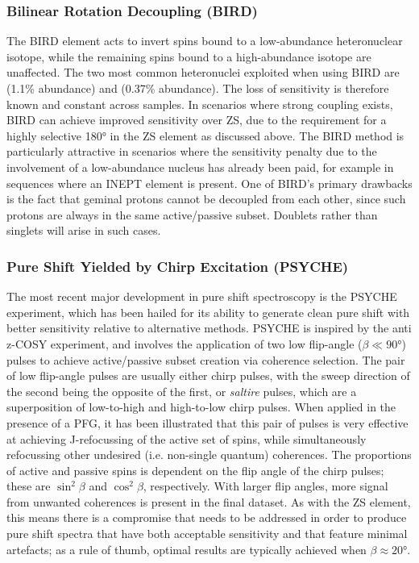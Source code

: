 \subsubsection{Bilinear Rotation Decoupling (BIRD)}
The \ac{BIRD} element acts to invert spins bound to a low-abundance
heteronuclear isotope, while the remaining spins bound to a high-abundance
isotope are unaffected\cite{Garbow1982,Bax1983}.
The two most common heteronuclei exploited when using \ac{BIRD} are 
(1.1\% abundance) and  (0.37\% abundance). The loss of sensitivity
is therefore known and constant across samples. In scenarios where strong
coupling exists, \ac{BIRD} can achieve improved sensitivity over \ac{ZS}, due
to the requirement for a highly selective \ang{180} in the \ac{ZS} element as
discussed above.
The \ac{BIRD} method is particularly attractive in scenarios where the
sensitivity penalty due to the involvement of a low-abundance nucleus has
already been paid, for example in sequences where an \ac{INEPT} element is
present\cite{Paudel2013}. One of \ac{BIRD}'s primary drawbacks is the fact that
geminal protons cannot be decoupled from each other, since such protons are
always in the same active/passive subset. Doublets rather than singlets will
arise in such cases.

\subsubsection{Pure Shift Yielded by Chirp Excitation (PSYCHE)}
\label{subsec:psyche}
The most recent major development in pure shift spectroscopy is the \ac{PSYCHE}
experiment\cite{Foroozandeh2014,Foroozandeh2018}, which has been hailed for its
ability to generate clean pure shift with better sensitivity relative to
alternative methods. \ac{PSYCHE} is inspired by
the anti z-\ac{COSY} experiment\cite{Thrippleton2003}, and involves the application
of two low flip-angle ($\beta \ll \ang{90}$) pulses to achieve active/passive
subset creation via coherence selection. The pair of low flip-angle pulses
are usually either chirp pulses, with the sweep direction of the second being
the opposite of the first, or \emph{saltire} pulses, which are a superposition
of low-to-high and high-to-low chirp pulses. When applied in the presence of a
\ac{PFG}, it has been illustrated that this pair of pulses is very effective at
achieving J-refocussing of the active set of spins, while simultaneously
refocussing other undesired (i.e. non-single quantum) coherences.
The proportions of active and passive spins is dependent on the flip angle of
the chirp pulses; these are $\sin^2 \beta$ and $\cos^2 \beta$,
respectively. With larger flip angles, more signal from unwanted
coherences is present in the final dataset. As with the \ac{ZS} element, this
means there is a compromise that needs to be addressed in order to produce
pure shift spectra that have both acceptable sensitivity and that feature
minimal artefacts; as a rule of thumb, optimal results are typically achieved
when $\beta \approx \ang{20}$.

